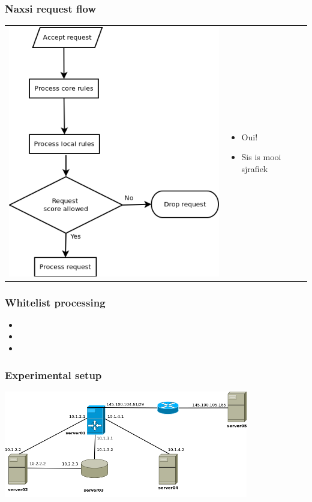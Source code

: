 \begin{frame}
  \frametitle{Naxsi request flow}
\begin{tabular}{ll}
\begin{minipage}[c]{0.3\textwidth}
\includegraphics[width=\textwidth]{../paper/images/naxsi_flow.png}
\end{minipage}
&
\begin{minipage}[c]{0.7\textwidth}
  \begin{itemize}
   \item Oui!
   \item Sis is mooi sjrafiek
  \end{itemize}
\end{minipage}
\end{tabular}
\end{frame}


\begin{frame}
  \frametitle{Whitelist processing}
   \begin{itemize}
   \item 
   \item 
   \item
  \end{itemize}
\end{frame}


\begin{frame}
  \frametitle{Experimental setup}
    \begin{center} 
      \includegraphics[width=0.80\textwidth]{../paper/images/infrastructure.png}
  \end{center}
\end{frame}
